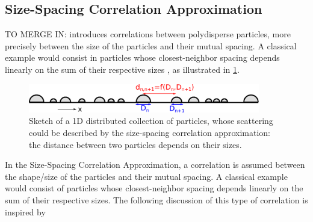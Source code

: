 \subsection{Size-Spacing Correlation Approximation}

TO MERGE IN:
introduces correlations between polydisperse particles, more precisely between the size of the particles and their mutual spacing. A classical example would consist in particles whose closest-neighbor spacing depends linearly on the sum of their respective sizes \cite{LaLR07}, as illustrated in \cref{fig:ssca}.


\begin{figure}[tb]
\begin{center}
\includegraphics[width=0.9\textwidth]{fig/drawing/drawingSSCA.pdf}
\end{center}
\caption{Sketch of a 1D distributed collection of particles, whose scattering could be described by the size-spacing correlation approximation: the distance between two particles depends on their sizes.}
\label{fig:ssca}
\end{figure}


In the Size-Spacing Correlation Approximation, a correlation is assumed between the shape/size of the particles and their mutual spacing. A classical example would consist of particles whose closest-neighbor spacing depends linearly on the sum of their respective sizes. The following discussion of this type of correlation is inspired by \cite{LaLR07}


